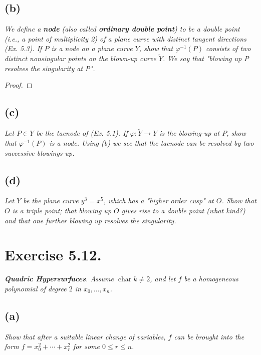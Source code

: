 \subsection{(b)}
\textit{We define a \textbf{node} (also called \textbf{ordinary double point}) to be a double point (i.e., a point of multiplicity 2) of a plane curve with distinct tangent directions (Ex. 5.3). If $P$ is a node on a plane curve $Y$, show that $\varphi^{-1}(P)$ consists of two distinct nonsingular points on the blown-up curve $\widetilde{Y}$. We say that "blowing
up P resolves the singularity at P".}

\begin{proof}
    
\end{proof}

\subsection{(c)}

\textit{Let $P\in Y$ be the tacnode of (Ex. 5.1). If $\varphi:\widetilde Y\to Y$ is the blowing-up at $P$, show that $\varphi^{-1}(P)$ is a node. Using (b) we see that the tacnode can be resolved by two successive blowings-up.}

\subsection{(d)}

\textit{Let $Y$ be the plane curve $y^3=x^5$, which has a "higher order cusp" at $O$. Show that $O$ is a triple point; that blowing up $O$ gives rise to a double point (what kind?) and that one further blowing up resolves the singularity.}


\section{Exercise 5.12.}

\textit{\textbf{Quadric Hypersurfaces}. Assume $\operatorname{char} k\neq 2$, and let $f$ be a homogeneous polynomial of degree $2$ in $x_0,...,x_n$.}

\subsection{(a)}

\textit{Show that after a suitable linear change of variables, $f$ can be brought into the form $f=x_0^2+\cdots+x_r^2$ for some $0\leq r\leq n$. }

